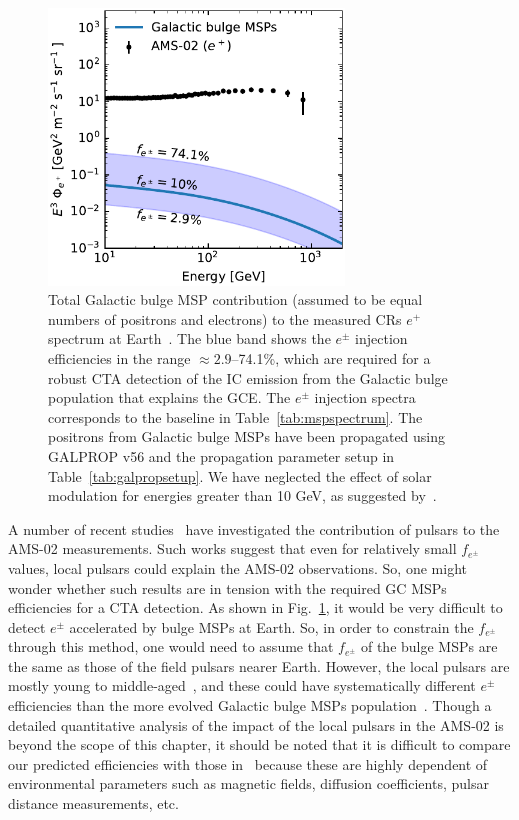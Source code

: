 \documentclass[doublespace,nopageskip]{VTthesis} %
\begin{document}
\begin{figure}[htb]
    \begin{center}
    \includegraphics[width=0.7\textwidth]{Figures/CTA/positrons_at_Earth.pdf}
    \caption{Total Galactic bulge MSP contribution (assumed to be equal numbers of positrons and electrons) to the measured CRs $e^+$ spectrum at Earth~\citep{Aguilar:2021tos}. The blue band shows the $e^\pm$ injection efficiencies in the range $\approx 2.9$--74.1\%, which are required for a robust CTA detection of the IC emission from the Galactic bulge population that explains the GCE. The $e^\pm$ injection spectra corresponds to the baseline in Table~\ref{tab:mspspectrum}.  The positrons from Galactic bulge MSPs have been propagated using \textsc{GALPROP} v56 and the propagation parameter setup in Table~\ref{tab:galpropsetup}. We have neglected the effect of solar modulation for energies greater than 10 GeV, as suggested by~\citet{Strauss:2015}.}\label{fig:MSPpositronsatEarth}
    \end{center}
 \end{figure}

A number of recent studies~\citep[e.g.,][]{Cholis:2018izys, Manconi:2020ipm} have investigated the contribution of pulsars to the AMS-02 measurements. Such works suggest that even for relatively small $f_{e^\pm}$ values, local pulsars could explain the AMS-02 observations. So, one might wonder whether such results are in tension with the required GC MSPs efficiencies for a CTA detection. As shown in Fig.~\ref{fig:MSPpositronsatEarth}, it would be very difficult to detect $e^\pm$ accelerated by bulge MSPs at Earth. So, in order to constrain the $f_{e^\pm}$ through this method, one would need to assume that $f_{e^\pm}$ of the bulge MSPs are the same as those of the field pulsars nearer Earth. However, the local pulsars are mostly young to middle-aged~\citep{Delahaye:2010}, and these could have systematically different $e^\pm$ efficiencies than the more evolved Galactic bulge MSPs population~\citep{Song:2021zrs}. Though a detailed quantitative analysis of the impact of the local pulsars in the AMS-02 is beyond the scope of this chapter, it should be noted that it is difficult to compare our predicted efficiencies with those in~\citep[e.g.,][]{Cholis:2018izys, Manconi:2020ipm} because these are highly dependent of environmental parameters such as magnetic fields, diffusion coefficients, pulsar distance measurements, etc.
\end{document}
